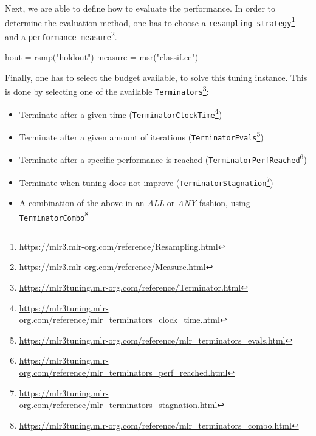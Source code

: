 \documentclass[12pt,]{scrbook}
\newenvironment{Shaded}{}{}
\newcommand{\DataTypeTok}[1]{#1}
\newcommand{\DecValTok}[1]{#1}
\newcommand{\FloatTok}[1]{#1}
\newcommand{\KeywordTok}[1]{\textcolor[rgb]{0.00,0.00,1.00}{#1}}
\newcommand{\NormalTok}[1]{#1}
\newcommand{\OperatorTok}[1]{#1}
\newcommand{\StringTok}[1]{\textcolor[rgb]{0.00,0.50,0.50}{#1}}
\providecommand{\tightlist}{%
  \setlength{\itemsep}{0pt}\setlength{\parskip}{0pt}}
\renewcommand{\href}[2]{#2\footnote{\url{#1}}}
\begin{document}
\begin{Shaded}
\end{Shaded}

Next, we are able to define how to evaluate the performance.
In order to determine the evaluation method, one has to choose a \href{https://mlr3.mlr-org.com/reference/Resampling.html}{\texttt{resampling\ strategy}} and a \href{https://mlr3.mlr-org.com/reference/Measure.html}{\texttt{performance\ measure}}.

\begin{Shaded}
\begin{Highlighting}[]
\NormalTok{hout =}\StringTok{ }\KeywordTok{rsmp}\NormalTok{(}\StringTok{"holdout"}\NormalTok{)}
\NormalTok{measure =}\StringTok{ }\KeywordTok{msr}\NormalTok{(}\StringTok{"classif.ce"}\NormalTok{)}
\end{Highlighting}
\end{Shaded}

Finally, one has to select the budget available, to solve this tuning instance.
This is done by selecting one of the available \href{https://mlr3tuning.mlr-org.com/reference/Terminator.html}{\texttt{Terminators}}:

\begin{itemize}
\tightlist
\item
  Terminate after a given time (\href{https://mlr3tuning.mlr-org.com/reference/mlr_terminators_clock_time.html}{\texttt{TerminatorClockTime}})
\item
  Terminate after a given amount of iterations (\href{https://mlr3tuning.mlr-org.com/reference/mlr_terminators_evals.html}{\texttt{TerminatorEvals}})
\item
  Terminate after a specific performance is reached (\href{https://mlr3tuning.mlr-org.com/reference/mlr_terminators_perf_reached.html}{\texttt{TerminatorPerfReached}})
\item
  Terminate when tuning does not improve (\href{https://mlr3tuning.mlr-org.com/reference/mlr_terminators_stagnation.html}{\texttt{TerminatorStagnation}})
\item
  A combination of the above in an \emph{ALL} or \emph{ANY} fashion, using \href{https://mlr3tuning.mlr-org.com/reference/mlr_terminators_combo.html}{\texttt{TerminatorCombo}}
\end{itemize}
\end{document}
